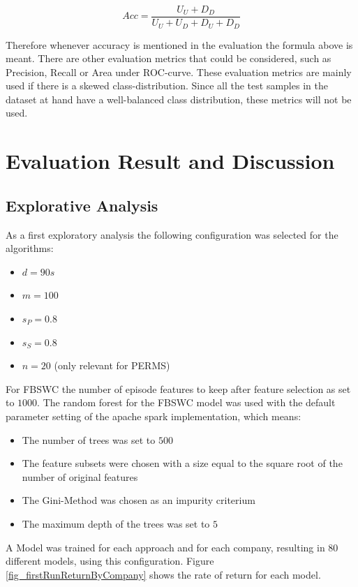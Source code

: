 \[ Acc = \frac{U_U + D_D}{U_U +U_D +D_U+D_D}\]

Therefore whenever accuracy  is mentioned in the evaluation the formula above is meant. There are other evaluation metrics that could be considered, such as Precision, Recall or Area under ROC-curve. These evaluation metrics are mainly used if there is a skewed class-distribution. Since all the test samples in the dataset at hand have a well-balanced class distribution, these metrics will not be used.



\section{Evaluation Result and Discussion}
\label{sec_evaluationResults}

\subsection{Explorative Analysis}
\label{subsec_explorativeAnalysis}

As a first exploratory analysis the following configuration was selected for the algorithms:

\begin{itemize}
	\item $d = 90s$
	\item $m = 100$ 
	\item $s_P = 0.8$
	\item $s_S = 0.8$
	\item $n = 20$ (only relevant for PERMS)
\end{itemize}

For FBSWC the number of episode features to keep after feature selection as set to $1000$. The random forest for the FBSWC model was used with the default parameter setting of the apache spark implementation, which means:

\begin{itemize}
	\item The number of trees was set to $500$
	\item The feature subsets were chosen with a size equal to the square root of the number of original features
	\item The Gini-Method was chosen as an impurity criterium
	\item The maximum depth of the trees was set to $5$
\end{itemize}

A Model was trained for each approach and for each company, resulting in 80 different models, using this configuration. Figure \ref{fig_firstRunReturnByCompany} shows the rate of return for each model.

